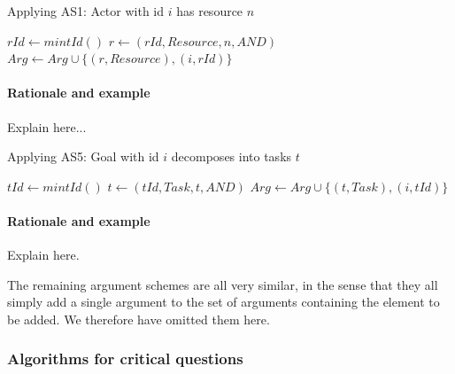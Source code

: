 \begin{algorithm}[h]
  \caption{Applying AS1: Actor with id $i$ has resource $n$}\label{alg:as1}
  \begin{algorithmic}[1]
    \State $rId\gets mintId()$
    \State $r\leftarrow (rId, Resource, n, AND)$
    \State $Arg\gets Arg\cup \{(r, Resource),(i,rId)\}$
    \EndProcedure
  \end{algorithmic}
\end{algorithm}

\paragraph{Rationale and example} Explain here...

\begin{algorithm}[h]
  \caption{Applying AS5: Goal with id $i$ decomposes into tasks $t$}\label{alg:as5}
  \begin{algorithmic}[1]
    \State $tId\gets mintId()$
    \State $t\leftarrow (tId, Task, t, AND)$
    \State $Arg\gets Arg\cup \{(t, Task),(i,tId)\}$
    \EndProcedure
  \end{algorithmic}
\end{algorithm}

\paragraph{Rationale and example} Explain here.


The remaining argument schemes are all very similar, in the sense that they all simply add a single argument to the set of arguments containing the element to be added. We therefore have omitted them here.

\subsubsection*{Algorithms for critical questions}
